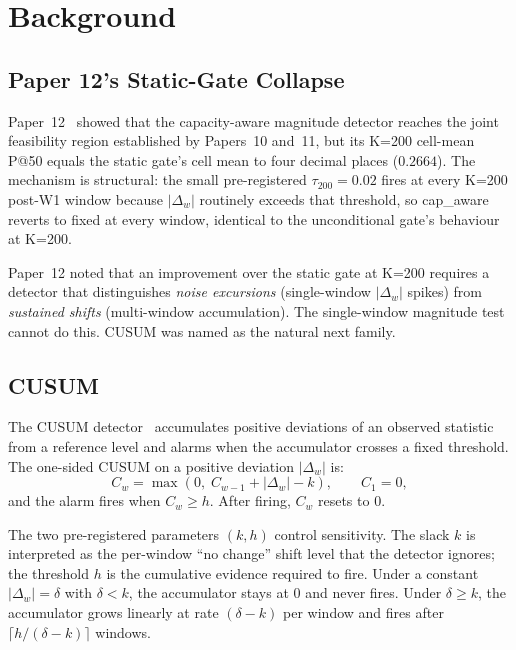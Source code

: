 \section{Background}

\subsection{Paper 12's Static-Gate Collapse}

Paper~12~\cite{paper12capaware} showed that the capacity-aware
magnitude detector reaches the joint feasibility region established
by Papers~10 and~11, but its K=200 cell-mean P@50 equals the static
gate's cell mean to four decimal places ($0.2664$). The mechanism is
structural: the small pre-registered $\tau_{200} = 0.02$ fires at
every K=200 post-W1 window because $|\Delta_w|$ routinely exceeds
that threshold, so cap\_aware reverts to fixed at every window, 
identical to the unconditional gate's behaviour at K=200.

Paper~12 noted that an improvement over the static gate at K=200
requires a detector that distinguishes \textit{noise excursions}
(single-window $|\Delta_w|$ spikes) from \textit{sustained shifts}
(multi-window accumulation). The single-window magnitude test
cannot do this. CUSUM was named as the natural next family.

\subsection{CUSUM}

The CUSUM detector~\cite{page1954cusum} accumulates positive
deviations of an observed statistic from a reference level and
alarms when the accumulator crosses a fixed threshold. The
one-sided CUSUM on a positive deviation $|\Delta_w|$ is:
\begin{equation}
C_w = \max(0,\; C_{w-1} + |\Delta_w| - k), \qquad C_1 = 0,
\end{equation}
and the alarm fires when $C_w \geq h$. After firing, $C_w$ resets
to $0$.

The two pre-registered parameters $(k, h)$ control sensitivity. The
slack $k$ is interpreted as the per-window ``no change'' shift level
that the detector ignores; the threshold $h$ is the cumulative
evidence required to fire. Under a constant $|\Delta_w| = \delta$
with $\delta < k$, the accumulator stays at $0$ and never fires.
Under $\delta \geq k$, the accumulator grows linearly at rate
$(\delta - k)$ per window and fires after $\lceil h / (\delta - k)
\rceil$ windows.

